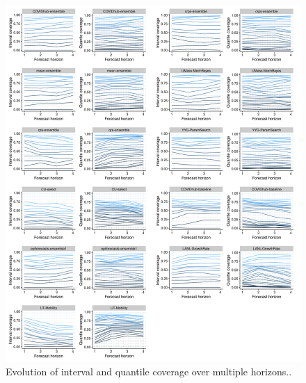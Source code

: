 \documentclass[
]{book}
\begin{document}
\begin{figure}
\includegraphics[width=1\linewidth]{../visualisation/chapter-5-results/scenario-baseline/APPENDIX-coverage-plots-horizons} \caption{Evolution of interval and quantile coverage over multiple horizons..}\label{fig:coverage-horizons}
\end{figure}


  
\end{document}
